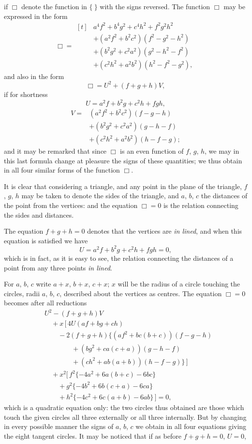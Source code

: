 \documentclass[11pt]{article}
\begin{document}
if $\Box$ denote the function in $\{\ \}$ with the signs reversed. The function $\Box$ may be expressed in the form
\[ \Box = \begin{aligned}[t]
&a^{4}f^{2}+b^{4}g^{2}+c^{4}h^{2}+f^{2}g^{2}h^{2}\\
&+(a^{2}f^{2}+b^{2}c^{2})(f^{2}-g^{2}-h^{2})\\
&+(b^{2}g^{2}+c^{2}a^{2})(g^{2}-h^{2}-f^{2})\\
&+(c^{2}h^{2}+a^{2}b^{2})(h^{2}-f^{2}-g^{2}),
\end{aligned} \]
and also in the form
\[ \Box = U^{2}+(f+g+h)V, \]
if for shortness
\[ U = a^{2}f+b^{2}g+c^{2}h+fgh, \]
\[ \begin{aligned}
V = {}& (a^{2}f^{2}+b^{2}c^{2})(f-g-h)\\
&+(b^{2}g^{2}+c^{2}a^{2})(g-h-f)\\
&+(c^{2}h^{2}+a^{2}b^{2})(h-f-g);
\end{aligned} \]
and it may be remarked that since $\Box$ is an even function of $f$, $g$, $h$, we may in this last formula change at pleasure the signs of these quantities; we thus obtain in all four similar forms of the function $\Box$.

It is clear that considering a triangle, and any point in the plane of the triangle, $f$, $g$, $h$ may be taken to denote the sides of the triangle, and $a$, $b$, $c$ the distances of the point from the vertices: and the equation $\Box=0$ is the relation connecting the sides and distances.

The equation $f+g+h=0$ denotes that the vertices are \emph{in lined}, and when this equation is satisfied we have
\[ U = a^{2}f+b^{2}g+c^{2}h+fgh = 0, \]
which is in fact, as it is easy to see, the relation connecting the distances of a point from any three points \emph{in lined}.

For $a$, $b$, $c$ write $a+x$, $b+x$, $c+x$; $x$ will be the radius of a circle touching the circles, radii $a$, $b$, $c$, described about the vertices as centres. The equation $\Box=0$ becomes after all reductions
{\small\begin{align*}
&U^{2}-(f+g+h)V\\
&\quad+x\,[\,4U(af+bg+ch)\\
&\qquad-2(f+g+h)\{(af^{2}+bc(b+c))(f-g-h)\\
&\qquad\qquad+(bg^{2}+ca(c+a))(g-h-f)\\
&\qquad\qquad+(ch^{2}+ab(a+b))(h-f-g)\}\,]\\
&\quad+x^{2}[\,f^{2}\{-4a^{2}+6a(b+c)-6bc\}\\
&\qquad+g^{2}\{-4b^{2}+6b(c+a)-6ca\}\\
&\qquad+h^{2}\{-4c^{2}+6c(a+b)-6ab\}\,] = 0,
\end{align*}}
which is a quadratic equation only: the two circles thus obtained are those which touch the given circles all three externally or all three internally. But by changing in every possible manner the signs of $a$, $b$, $c$ we obtain in all four equations giving the eight tangent circles. It may be noticed that if as before $f+g+h=0$, $U=0$,
\end{document}
